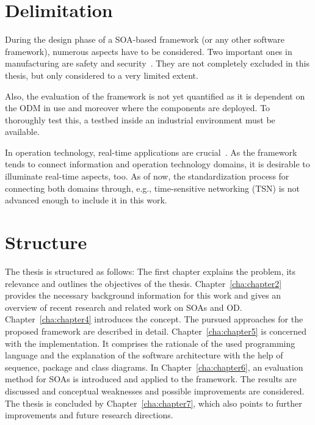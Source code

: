 \section{Delimitation}
During the design phase of a SOA-based framework (or any other software framework), numerous aspects have to be considered. Two important ones in manufacturing are safety and security~\cite{Hornberg2017HandbookVision}. They are not completely excluded in this thesis, but only considered to a very limited extent.

Also, the evaluation of the framework is not yet quantified as it is dependent on the ODM in use and moreover where the components are deployed. To thoroughly test this, a testbed inside an industrial environment must be available.

In operation technology, real-time applications are crucial~\cite{Wilmes2019ZauberwortKonvergenz}. As the framework tends to connect information and operation technology domains, it is desirable to illuminate real-time aspects, too. As of now, the standardization process for connecting both domains through, e.g., time-sensitive networking (TSN) is not advanced enough to include it in this work.

\section{Structure}
The thesis is structured as follows: The first chapter explains the problem, its relevance and outlines the objectives of the thesis. Chapter~\ref{cha:chapter2} provides the necessary background information for this work and gives an overview of recent research and related work on SOAs and OD. Chapter~\ref{cha:chapter4} introduces the concept. The pursued approaches for the proposed framework are described in detail. Chapter~\ref{cha:chapter5} is concerned with the implementation. It comprises the rationale of the used programming language and the explanation of the software architecture with the help of sequence, package and class diagrams. In Chapter~\ref{cha:chapter6}, an evaluation method for SOAs is introduced and applied to the framework. The results are discussed and conceptual weaknesses and possible improvements are considered. The thesis is concluded by Chapter~\ref{cha:chapter7}, which also points to further improvements and future research directions.